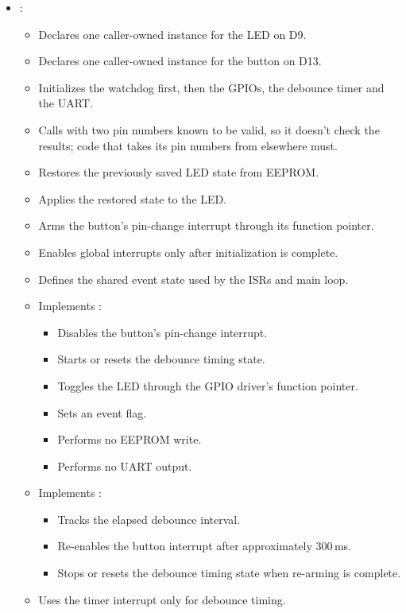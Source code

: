 \begin{itemize}
  \item {}:
  \begin{itemize}
    \item Declares one caller-owned  instance for the LED on D9.
    \item Declares one caller-owned  instance for the button on D13.
    \item Initializes the watchdog first, then the GPIOs, the debounce timer and the UART.
    \item Calls  with two pin numbers known to be valid, so it doesn't check the
      results; code that takes its pin numbers from elsewhere must.
    \item Restores the previously saved LED state from EEPROM.
    \item Applies the restored state to the LED.
    \item Arms the button's pin-change interrupt through its  function pointer.
    \item Enables global interrupts only after initialization is complete.
    \item Defines the shared event state used by the ISRs and main loop.
    \item Implements :
    \begin{itemize}
      \item Disables the button's pin-change interrupt.
      \item Starts or resets the debounce timing state.
      \item Toggles the LED through the GPIO driver's function pointer.
      \item Sets an event flag.
      \item Performs no EEPROM write.
      \item Performs no UART output.
    \end{itemize}
    \item Implements :
    \begin{itemize}
      \item Tracks the elapsed debounce interval.
      \item Re-enables the button interrupt after approximately 300\,ms.
      \item Stops or resets the debounce timing state when re-arming is complete.
    \end{itemize}
    \item Uses the timer interrupt only for debounce timing.

\end{itemize}
\end{itemize}

